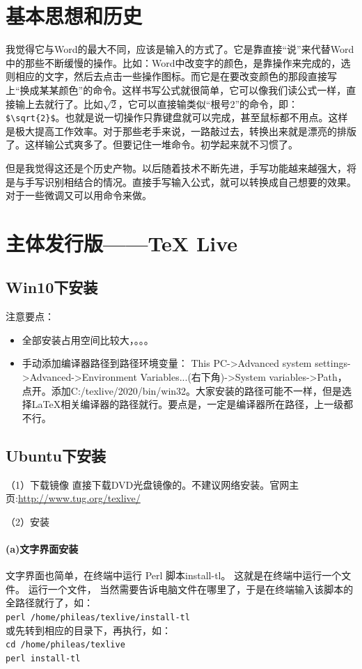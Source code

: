\section{基本思想和历史}
我觉得它与Word的最大不同，应该是输入的方式了。它是靠直接“说”来代替Word中的那些不断缓慢的操作。比如：Word中改变字的颜色，是靠操作来完成的，选则相应的文字，然后去点击一些操作图标。而它是在要改变颜色的那段直接写上“换成某某颜色”的命令。这样书写公式就很简单，它可以像我们读公式一样，直接输上去就行了。比如$\sqrt{2}$，它可以直接输类似“根号2”的命令，即：\verb|$\sqrt{2}$|。也就是说一切操作只靠键盘就可以完成，甚至鼠标都不用点。这样是极大提高工作效率。对于那些老手来说，一路敲过去，转换出来就是漂亮的排版了。这样输公式爽多了。但要记住一堆命令。初学起来就不习惯了。

但是我觉得这还是个历史产物。以后随着技术不断先进，手写功能越来越强大，将是与手写识别相结合的情况。直接手写输入公式，就可以转换成自己想要的效果。对于一些微调又可以用命令来做。




\section{主体发行版——\TeX{} Live }
\subsection{Win10下安装}
注意要点：
\begin{itemize}
\item 全部安装占用空间比较大，。。。
\item 手动添加编译器路径到路径环境变量：
This PC->Advanced system settings->Advanced->Environment Variables...(右下角)->System variables->Path，点开。添加C:/texlive/2020/bin/win32。大家安装的路径可能不一样，但是选择\LaTeX{}相关编译器的路径就行。要点是，一定是编译器所在路径，上一级都不行。
\end{itemize}



\subsection{Ubuntu下安装}
（1）下载镜像
直接下载DVD光盘镜像的。不建议网络安装。官网主页:\url{http://www.tug.org/texlive/}


（2）安装
\paragraph{(a)文字界面安装}
文字界面也简单，在终端中运行 Perl 脚本install-tl。 这就是在终端中运行一个文件。 运行一个文件， 当然需要告诉电脑文件在哪里了，于是在终端输入该脚本的全路径就行了，如：\\
\verb*|perl /home/phileas/texlive/install-tl|\\
或先转到相应的目录下，再执行，如：\\
\verb*|cd /home/phileas/texlive|\\
\verb*|perl install-tl|

